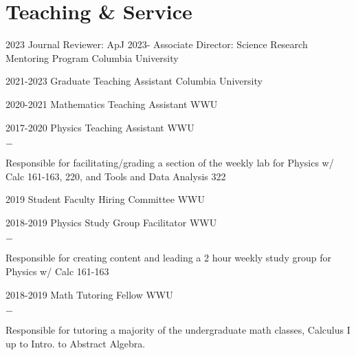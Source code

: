 \documentclass[]{scoggins-cv} %
\begin{document}
\section{Teaching \& Service}
\begin{entrylist}
\vspace{-0.3cm}


    \entry
    {2023}
    {Journal Reviewer: {\normalfont ApJ}} 
    {}
    {}
    \entry
    {2023-}
	{Associate Director: {\normalfont Science Research Mentoring Program}}
    {Columbia University}
	{}

    \entry
    {2021-2023}
    {Graduate Teaching Assistant}
    {Columbia University}
	{}


    \entry
    {2020-2021}
    {Mathematics Teaching Assistant}
    {WWU}
	{}


    \entry
    {2017-2020}
    {Physics Teaching Assistant}
    {WWU}
    {%
        \vspace{-1em}
        \begin{list}{{\color{numcolor}$-$}}{\cvlist}
            \item Responsible for facilitating/grading a section of the weekly lab for Physics w/ Calc 161-163, 220, and Tools and Data Analysis 322
        \end{list}
    }


    \entry
    {2019}
    {Student Faculty Hiring Committee}
    {WWU}
	{}


    \entry
    {2018-2019}
    {Physics Study Group Facilitator}
    {WWU}
    {%
        \vspace{-1em}
        \begin{list}{{\color{numcolor}$-$}}{\cvlist}
            \item Responsible for creating content and leading a 2 hour weekly study group for Physics w/ Calc 161-163
        \end{list}
    }


    \entry
    {2018-2019}
    {Math Tutoring Fellow}
    {WWU}
    {%
        \vspace{-1em}
        \begin{list}{{\color{numcolor}$-$}}{\cvlist}
            \item Responsible for tutoring a majority of the undergraduate math classes, Calculus I up to Intro. to Abstract Algebra.
        \end{list}
    }


\end{entrylist}
\end{document}
